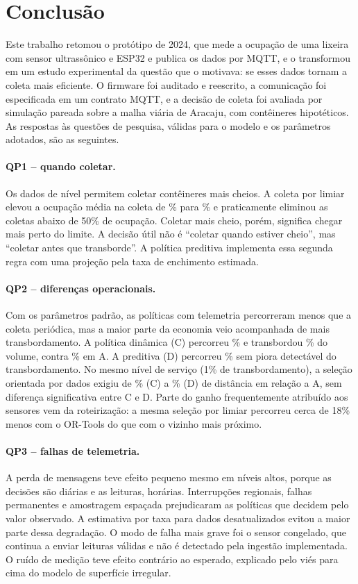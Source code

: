 \section{Conclusão}\label{sec:conclusao}

Este trabalho retomou o protótipo de 2024, que mede a ocupação de uma lixeira
com sensor ultrassônico e ESP32 e publica os dados por MQTT, e o transformou
em um estudo experimental da questão que o motivava: se esses dados tornam a
coleta mais eficiente. O firmware foi auditado e reescrito, a comunicação foi
especificada em um contrato MQTT, e a decisão de coleta foi avaliada por
simulação pareada sobre a malha viária de Aracaju, com contêineres
hipotéticos. As respostas às questões de pesquisa, válidas para o modelo e os
parâmetros adotados, são as seguintes.

\paragraph{QP1 -- quando coletar.}
Os dados de nível permitem coletar contêineres mais cheios. A coleta por
limiar elevou a ocupação média na coleta de \FillNCemA\% para \FillNCemB\%
e praticamente eliminou as coletas abaixo de 50\% de ocupação. Coletar mais
cheio, porém, significa chegar mais perto do limite. A decisão útil não é
``coletar quando estiver cheio'', mas ``coletar antes que transborde''. A
política preditiva implementa essa segunda regra com uma projeção pela taxa
de enchimento estimada.

\paragraph{QP2 -- diferenças operacionais.}
Com os parâmetros padrão, as políticas com telemetria percorreram menos que a
coleta periódica, mas a maior parte da economia veio acompanhada de mais
transbordamento. A política dinâmica (C) percorreu \RelNCemCvsAKm\% e
transbordou \OvNCemC\% do volume, contra \OvNCemA\% em A. A preditiva (D)
percorreu \RelNCemDvsAKm\% sem piora detectável do transbordamento. No mesmo
nível de serviço (1\% de transbordamento), a seleção orientada por dados
exigiu de \RelFrontUmCvsA\% (C) a \RelFrontUmDvsA\% (D) de distância em
relação a A, sem diferença significativa entre C e D. Parte do ganho
frequentemente atribuído aos sensores vem da roteirização: a mesma seleção
por limiar percorreu cerca de 18\% menos com o OR-Tools do que com o vizinho
mais próximo.

\paragraph{QP3 -- falhas de telemetria.}
A perda de mensagens teve efeito pequeno mesmo em níveis altos, porque as
decisões são diárias e as leituras, horárias. Interrupções regionais, falhas
permanentes e amostragem espaçada prejudicaram as políticas que decidem pelo
valor observado. A estimativa por taxa para dados desatualizados evitou a
maior parte dessa degradação. O modo de falha mais grave foi o sensor
congelado, que continua a enviar leituras válidas e não é detectado pela
ingestão implementada. O ruído de medição teve efeito contrário ao esperado,
explicado pelo viés para cima do modelo de superfície irregular.

